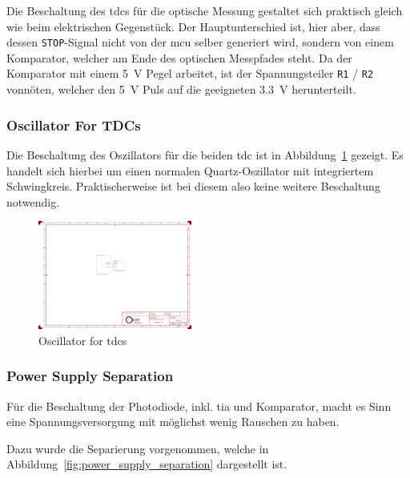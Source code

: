 Die Beschaltung des \acrshort{tdc}s für die optische Messung gestaltet sich praktisch gleich wie beim elektrischen
Gegenstück. Der Hauptunterschied ist, hier aber, dass dessen \lstinline|STOP|-Signal nicht von der \acrshort{mcu} selber generiert
wird, sondern von einem Komparator, welcher am Ende des optischen Messpfades steht. Da der Komparator mit einem 5~V Pegel
arbeitet, ist der Spannungsteiler \lstinline|R1| / \lstinline|R2| vonnöten, welcher den 5~V Puls auf die geeigneten 3.3~V
herunterteilt.

\subsubsection{Oscillator For TDCs}

Die Beschaltung des Oszillators für die beiden \acrshort{tdc} ist in Abbildung~\ref{fig:oscillator_tdc} gezeigt. Es
handelt sich hierbei um einen normalen Quartz-Oszillator mit integriertem Schwingkreis. Praktischerweise ist bei diesem
also keine weitere Beschaltung notwendig.

\begin{figure}[H]
    \centering
    \includegraphics[page=2, trim=80 90 930 550, clip, width=0.45\textwidth]{attachments/schematic.pdf}
    \caption{Oscillator for \acrshort{tdc}s}\label{fig:oscillator_tdc}
\end{figure}

\subsubsection{Power Supply Separation}

Für die Beschaltung der Photodiode, inkl. \acrshort{tia} und Komparator, macht es Sinn eine Spannungsversorgung mit
möglichst wenig Rauschen zu haben.

Dazu wurde die Separierung vorgenommen, welche in Abbildung~\ref{fig:power_supply_separation} dargestellt ist.

